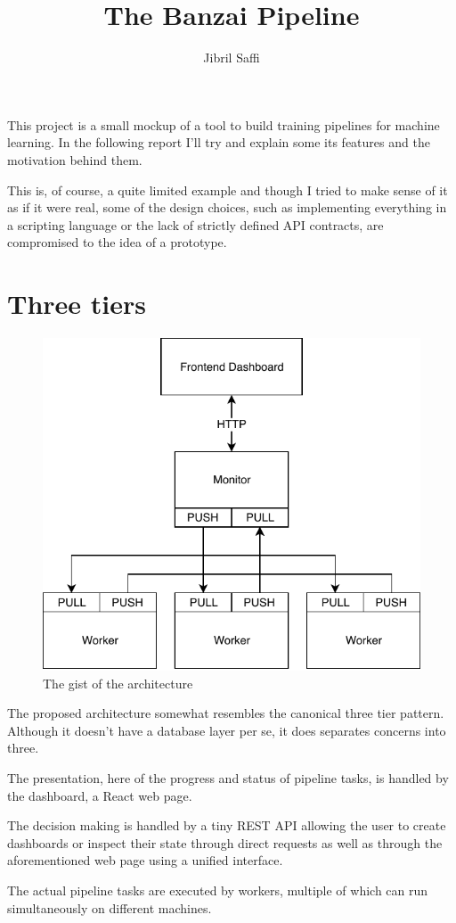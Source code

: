 \documentclass[12pt, a4paper]{article}
\title{The Banzai Pipeline}
\author{Jibril Saffi}
\begin{document}
\maketitle

This project is a small mockup of a tool to build training pipelines for machine learning.
In the following report I'll try and explain some its features and the motivation behind them.

This is, of course, a quite limited example and though I tried to make sense of it as if it were
real, some of the design choices, such as implementing everything in a scripting language or the
lack of strictly defined API contracts, are compromised to the idea of a prototype.

\section{Three tiers}

\begin{figure}[htpb]
    \centering
    \includegraphics[width=0.6\linewidth]{arch.pdf}
    \caption{The gist of the architecture}
\end{figure}

The proposed architecture somewhat resembles the canonical three tier pattern.
Although it doesn't have a database layer per se, it does separates concerns into three.

The presentation, here of the progress and status of pipeline tasks, is handled by the dashboard, a React web page.

The decision making is handled by a tiny REST API allowing the user to create dashboards or inspect
their state through direct requests as well as through the aforementioned web page using a unified interface.

The actual pipeline tasks are executed by workers, multiple of which can run simultaneously on different machines.
\end{document}
